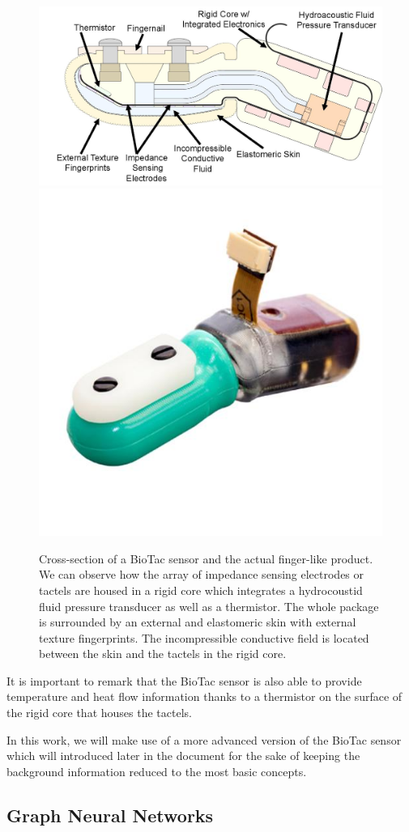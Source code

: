 \begin{figure}[!thb]
    \centering
    \includegraphics[width=0.65\linewidth]{Figures/Tactile/biotac_1}
    \includegraphics[width=0.34\linewidth]{Figures/Tactile/biotac_2}
    \caption{Cross-section of a BioTac sensor \cite{Syntouch2018} and the actual finger-like product. We can observe how the array of impedance sensing electrodes or tactels are housed in a rigid core which integrates a hydrocoustid fluid pressure transducer as well as a thermistor. The whole package is surrounded by an external and elastomeric skin with external texture fingerprints. The incompressible conductive field is located between the skin and the tactels in the rigid core.}
    \label{fig:tactile:biotac_sensor}
\end{figure}

It is important to remark that the BioTac sensor is also able to provide temperature and heat flow information thanks to a thermistor on the surface of the rigid core that houses the tactels.

In this work, we will make use of a more advanced version of the BioTac sensor which will introduced later in the document for the sake of keeping the background information reduced to the most basic concepts.

\subsection{Graph Neural Networks}

